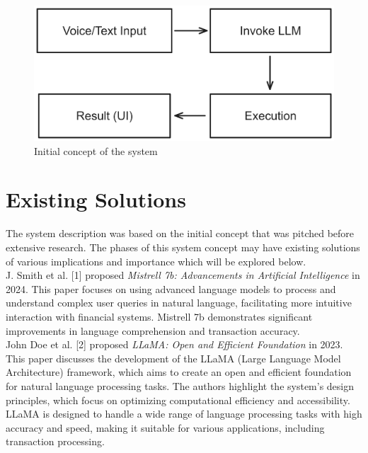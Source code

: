 \begin{figure}[h!]
    \centering
    \includegraphics[width=1\textwidth]{Images/prop_sys/overview_prop_sys.png}
    \caption{Initial concept of the system}
\end{figure}

\section{Existing Solutions}

\noindent
The system description was based on the initial concept that was pitched before extensive research. The phases of this system concept may have existing solutions of various implications and importance which will be explored below.\\

\noindent
J. Smith et al. [1] proposed {\it Mistrell 7b: Advancements in Artificial Intelligence} in 2024.
\noindent
This paper focuses on using advanced language models to process and understand complex user queries in natural language, facilitating more intuitive interaction with financial systems. Mistrell 7b demonstrates significant improvements in language comprehension and transaction accuracy. \\

\noindent
John Doe et al. [2] proposed {\it LLaMA: Open and Efficient Foundation} in 2023. 
\noindent
This paper discusses the development of the LLaMA (Large Language Model Architecture) framework, which aims to create an open and efficient foundation for natural language processing tasks. The authors highlight the system's design principles, which focus on optimizing computational efficiency and accessibility. LLaMA is designed to handle a wide range of language processing tasks with high accuracy and speed, making it suitable for various applications, including transaction processing.\\


